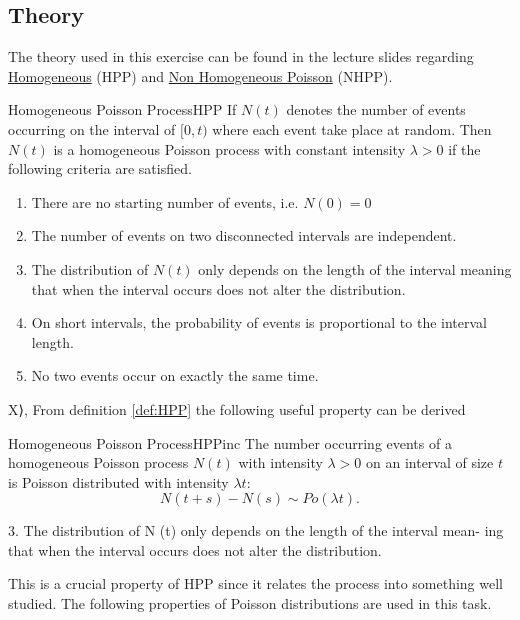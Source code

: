 \subsection{Theory}
\label{sec:theory3} 
The theory used in this exercise can be found in the lecture slides regarding \href{https://www.canvas.umu.se/courses/6705/files/1700861?module_item_id=311131}{Homogeneous} (HPP) and \href{https://www.canvas.umu.se/courses/6705/files/1700861?module_item_id=311131}{Non Homogeneous Poisson} (NHPP).
\begin{definition}{Homogeneous Poisson Process}{HPP}
    If $N(t)$ denotes the number of events occurring on the interval of $[0,t)$ where each event take place at random. Then $N(t)$ is a homogeneous Poisson process with constant intensity $\lambda>0$ if the following criteria are satisfied.
    \begin{enumerate}
        \item There are no starting number of events, i.e. $N(0)=0$
        \item The number of events on two disconnected intervals are independent.
        \item The distribution of $N(t)$ only depends on the length of the interval meaning that when the interval occurs does not alter the distribution.
        \item On short intervals, the probability of events is proportional to the interval length.
        \item No two events occur on exactly the same time.
    \end{enumerate}
\end{definition}
X⟩,
\noindent
From definition \ref{def:HPP} the following useful property can be derived
\begin{property}{Homogeneous Poisson Process}{HPPinc}
The number occurring events of a homogeneous Poisson process $N(t)$ with intensity $\lambda>0$ on an interval of size $t$ is Poisson distributed with intensity $\lambda t$:
\begin{equation}
    N(t+s)-N(s)\sim \textit{Po}(\lambda t) .
\end{equation}
\label{eq:HPPincDist}
\end{property}3. The distribution of N (t) only depends on the length of the interval mean-
ing that when the interval occurs does not alter the distribution.

This is a crucial property of HPP since it relates the process into something well studied. The following properties of Poisson distributions are used in this task.

